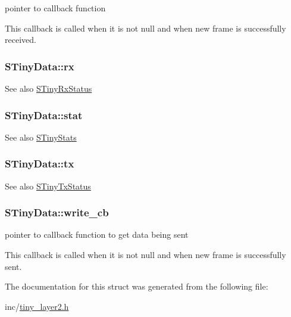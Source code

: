 pointer to callback function 

This callback is called when it is not null and when new frame is successfully received. \hypertarget{structSTinyData_aa3b43db99a1a6bf3d562f932d5a539db}{}
\subsubsection[{rx}]{ S\+Tiny\+Data\+::rx}\label{structSTinyData_aa3b43db99a1a6bf3d562f932d5a539db}
\begin{DoxySeeAlso}{See also}
\hyperlink{structSTinyRxStatus}{S\+Tiny\+Rx\+Status} 
\end{DoxySeeAlso}
\hypertarget{structSTinyData_a16ba8c9e60d6aee3fcd4909f85561f3d}{}
\subsubsection[{stat}]{ S\+Tiny\+Data\+::stat}\label{structSTinyData_a16ba8c9e60d6aee3fcd4909f85561f3d}
\begin{DoxySeeAlso}{See also}
\hyperlink{structSTinyStats}{S\+Tiny\+Stats} 
\end{DoxySeeAlso}
\hypertarget{structSTinyData_aa099adb35f3494332747eb18851fbb23}{}
\subsubsection[{tx}]{ S\+Tiny\+Data\+::tx}\label{structSTinyData_aa099adb35f3494332747eb18851fbb23}
\begin{DoxySeeAlso}{See also}
\hyperlink{structSTinyTxStatus}{S\+Tiny\+Tx\+Status} 
\end{DoxySeeAlso}
\hypertarget{structSTinyData_ada334c88e86bfd2c10191f65818c3fb3}{}
\subsubsection[{write\+\_\+cb}]{ S\+Tiny\+Data\+::write\+\_\+cb}\label{structSTinyData_ada334c88e86bfd2c10191f65818c3fb3}


pointer to callback function to get data being sent 

This callback is called when it is not null and when new frame is successfully sent. 

The documentation for this struct was generated from the following file\+:\begin{DoxyCompactItemize}
\item 
inc/\hyperlink{tiny__layer2_8h}{tiny\+\_\+layer2.\+h}\end{DoxyCompactItemize}
